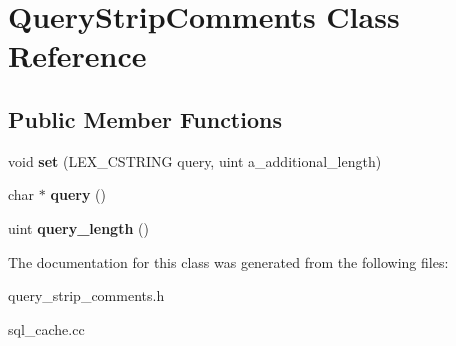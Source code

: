 \hypertarget{classQueryStripComments}{}\section{Query\+Strip\+Comments Class Reference}
\label{classQueryStripComments}
\subsection*{Public Member Functions}
\begin{DoxyCompactItemize}
\item 
\mbox{\label{classQueryStripComments_aad1870a93faf6bdba6da5856664f2d56}} 
void {\bfseries set} (L\+E\+X\+\_\+\+C\+S\+T\+R\+I\+NG query, uint a\+\_\+additional\+\_\+length)
\item 
\mbox{\label{classQueryStripComments_a477f6d02f58416244b86dc1e857b07e4}} 
char $\ast$ {\bfseries query} ()
\item 
\mbox{\label{classQueryStripComments_a0a2ce7ebf0edee76d2d45ceb1eb311df}} 
uint {\bfseries query\+\_\+length} ()
\end{DoxyCompactItemize}


The documentation for this class was generated from the following files\+:\begin{DoxyCompactItemize}
\item 
query\+\_\+strip\+\_\+comments.\+h\item 
sql\+\_\+cache.\+cc\end{DoxyCompactItemize}
